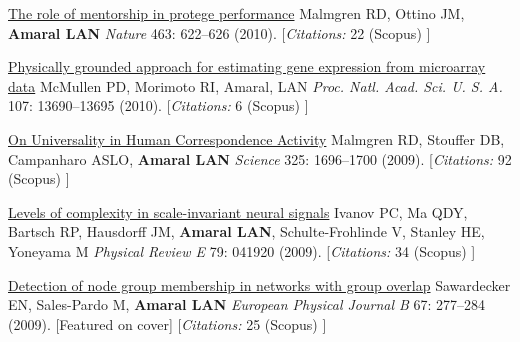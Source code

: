 \NumberedItem{\makebox[0.8cm][r]{[87]}}
\href{/people/amaral/role-mentorship-protege-performance}
{The role of mentorship in protege performance}
\newline
Malmgren RD, Ottino JM, {\textbf{Amaral LAN}}
\newline
\textit{Nature}
    463:
622--626 (2010).
    [{\em{Citations:}}  22 (Scopus) ]
\newline
\Gap
~
\Gap

\NumberedItem{\makebox[0.8cm][r]{[86]}}
\href{/people/amaral/physically-grounded-approach-estimating-gene-expression-microarray-data}
{Physically grounded approach for estimating gene expression from microarray data}
\newline
McMullen PD, Morimoto RI, Amaral, LAN
\newline
\textit{Proc. Natl. Acad. Sci. U. S. A.}
    107:
13690--13695 (2010).
    [{\em{Citations:}}  6 (Scopus) ]
\newline
\Gap
~
\Gap

\NumberedItem{\makebox[0.8cm][r]{[85]}}
\href{/people/amaral/universality-human-correspondence-activity}
{On Universality in Human Correspondence Activity}
\newline
Malmgren RD, Stouffer DB, Campanharo ASLO, {\textbf{Amaral LAN}}
\newline
\textit{Science}
    325:
1696--1700 (2009).
    [{\em{Citations:}}  92 (Scopus) ]
\newline
\Gap
~
\Gap

\NumberedItem{\makebox[0.8cm][r]{[84]}}
\href{/people/amaral/levels-of-complexity-in-scale-invariant-neural-signals}
{Levels of complexity in scale-invariant neural signals}
\newline
Ivanov PC, Ma QDY, Bartsch RP, Hausdorff JM, {\textbf{Amaral LAN}}, Schulte-Frohlinde V, Stanley HE, Yoneyama M
\newline
\textit{Physical Review E}
    79:
041920 (2009).
    [{\em{Citations:}}  34 (Scopus) ]
\newline
\Gap
~
\Gap

\NumberedItem{\makebox[0.8cm][r]{[83]}}
\href{/people/amaral/detection-of-node-group-membership-in-networks-with-group-overlap}
{Detection of node group membership in networks with group overlap}
\newline
Sawardecker EN, Sales-Pardo M, {\textbf{Amaral LAN}}
\newline
\textit{European Physical Journal B}
    67:
277--284 (2009).
    [Featured on cover]
    [{\em{Citations:}}  25 (Scopus) ]
\newline
\Gap
~
\Gap

